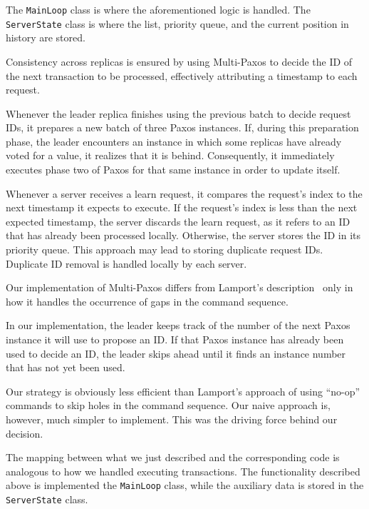 \documentclass[times, 10pt,twocolumn]{article}
\begin{document}
    The \verb|MainLoop| class is where the aforementioned logic is handled. The
    \verb|ServerState| class is where the list, priority queue, and the current
    position in history are stored.

    Consistency across replicas is ensured by using Multi-Paxos to decide the
    ID of the next transaction to be processed, effectively attributing a
    timestamp to each request.

    Whenever the leader replica finishes using the previous batch to decide
    request IDs, it prepares a new batch of three Paxos instances. If, during
    this preparation phase, the leader encounters an instance in which some
    replicas have already voted for a value, it realizes that it is behind.
    Consequently, it immediately executes phase two of Paxos for that same
    instance in order to update itself.

    Whenever a server receives a learn request, it compares the request's index
    to the next timestamp it expects to execute. If the request's index is less
    than the next expected timestamp, the server discards the learn request, as
    it refers to an ID that has already been processed locally. Otherwise, the
    server stores the ID in its priority queue. This approach may lead to
    storing duplicate request IDs. Duplicate ID removal is handled locally by
    each server.

    Our implementation of Multi-Paxos differs from Lamport's
    description~\cite{lamport2001paxos} only in how it handles the occurrence of
    gaps in the command sequence.

    In our implementation, the leader keeps track of the number of the next
    Paxos instance it will use to propose an ID. If that Paxos instance has
    already been used to decide an ID, the leader skips ahead until it finds an
    instance number that has not yet been used.

    Our strategy is obviously less efficient than Lamport's approach of using
    ``no-op'' commands to skip holes in the command sequence. Our naive approach
    is, however, much simpler to implement. This was the driving force behind
    our decision.

    The mapping between what we just described and the corresponding code is
    analogous to how we handled executing transactions. The functionality
    described above is implemented the \verb|MainLoop| class, while the
    auxiliary data is stored in the \verb|ServerState| class.
\end{document}
